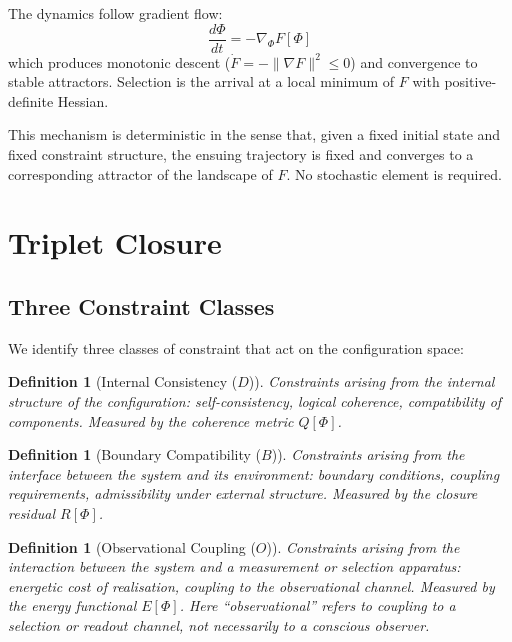 \documentclass[12pt]{article}
\newtheorem{definition}[theorem]{Definition}
\begin{document}
The dynamics follow gradient flow:
\begin{equation}\label{eq:flow}
    \frac{d\Phi}{dt} = -\nabla_\Phi F[\Phi]
\end{equation}
which produces monotonic descent ($\dot{F} = -\|\nabla F\|^2 \leq 0$) and convergence to stable attractors. Selection is the arrival at a local minimum of $F$ with positive-definite Hessian.

This mechanism is deterministic in the sense that, given a fixed initial state and fixed constraint structure, the ensuing trajectory is fixed and converges to a corresponding attractor of the landscape of $F$. No stochastic element is required.

\section{Triplet Closure}\label{sec:triplet}

\subsection{Three Constraint Classes}

We identify three classes of constraint that act on the configuration space:

\begin{definition}[Internal Consistency ($D$)]
Constraints arising from the internal structure of the configuration: self-consistency, logical coherence, compatibility of components. Measured by the coherence metric $Q[\Phi]$.
\end{definition}

\begin{definition}[Boundary Compatibility ($B$)]
Constraints arising from the interface between the system and its environment: boundary conditions, coupling requirements, admissibility under external structure. Measured by the closure residual $R[\Phi]$.
\end{definition}

\begin{definition}[Observational Coupling ($O$)]
Constraints arising from the interaction between the system and a measurement or selection apparatus: energetic cost of realisation, coupling to the observational channel. Measured by the energy functional $E[\Phi]$. Here ``observational'' refers to coupling to a selection or readout channel, not necessarily to a conscious observer.
\end{definition}
\end{document}
